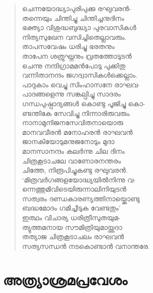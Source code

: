 \begin{verse}
ചെന്നയോദ്ധ്യാപുരിപുക്കു രഘുവരന്‍-\\
തന്നെയും ചിന്തിച്ചു ചിന്തിച്ചനുദിനം\\
ഭക്ത്യാ വിശുദ്ധബുദ്ധ്യാ പുരവാസികള്‍\\
നിത്യസുഖേന വസിച്ചിതെല്ലാവരും.\\
താപസവേഷം ധരിച്ചു ഭരതനും\\
താപേന ശത്രുഘ്നനും വ്രതത്തോടുടന്‍\\
ചെന്നു നന്ദിഗ്രാമമന്‍പോടു പുക്കിതു\\
വന്നിതാനന്ദം ജഗദ്വാസികള്‍ക്കെല്ലാം.\\
പാദുകാം വെച്ചു സിംഹാസനേ രാഘവ-\\
പാദങ്ങളെന്നു സങ്കല്പിച്ചു സാദരം\\
ഗന്ധപുഷ്പാദ്യങ്ങള്‍ കൊണ്ടു പൂജിച്ചു കൊ-\\
ണ്ടന്തികേ സേവിച്ചു നിന്നാരിരുവരും.\\
നാനാമുനിജനസേവിതനായൊരു\\
മാനവവീരന്‍ മനോഹരന്‍ രാഘവന്‍\\
ജാനകിയോടുമനുജനോടും മുദാ\\
മാനസാനന്ദം കലര്‍ന്നു ചില ദിനം\\
ചിത്രകൂടാചലേ വാണോരനന്തരം\\
ചിത്തേ, നിരൂപിച്ചുകണ്ടു രഘുവരന്‍.\\
‘മിത്രവര്‍ഗങ്ങളയോദ്ധ്യയില്‍നിന്നു വ-\\
ന്നെത്തുമിവിടെയിരുന്നാലിനിയുടന്‍\\
സത്വരം ദണ്ഡകാരണ്യത്തിനായ്ക്കൊണ്ടു\\
ബദ്ധമോദം ഗമിച്ചീടുക വേണ്ടതും’\\
ഇത്ഥം വിചാര്യ ധരിത്രീസുതയുമ-\\
ത്യുത്തമനായ സൗമിത്രിയുമായ്ത്തദാ\\
തത്യാജ ചിത്രകൂടാചലം രാഘവന്‍\\
സത്യസന്ധന്‍ നടകൊണ്ടാന്‍ വനാന്തരേ.
\end{verse}


\section{അത്ര്യാശ്രമപ്രവേശം}

